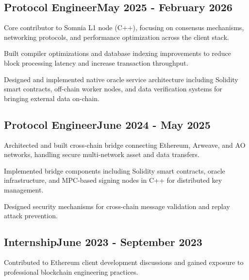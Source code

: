 \documentclass[a4paper,12pt]{article}
\begin{document}
\vspace*{6pt}
\subsection{{Protocol Engineer}\hfill May 2025 - February 2026}
\begin{zitemize}
    \item Core contributor to Somnia L1 node (C++), focusing on consensus mechanisms, networking protocols, and performance optimization across the client stack.
    \item Built compiler optimizations and database indexing improvements to reduce block processing latency and increase transaction throughput.
    \item Designed and implemented native oracle service architecture including Solidity smart contracts, off-chain worker nodes, and data verification systems for bringing external data on-chain.
\end{zitemize}

\vspace*{6pt}
\subsection{{Protocol Engineer}\hfill June 2024 - May 2025}
\begin{zitemize}
    \item Architected and built cross-chain bridge connecting Ethereum, Arweave, and AO networks, handling secure multi-network asset and data transfers.
    \item Implemented bridge components including Solidity smart contracts, oracle infrastructure, and MPC-based signing nodes in C++ for distributed key management.
    \item Designed security mechanisms for cross-chain message validation and replay attack prevention.
\end{zitemize}

\vspace*{3pt}
\subsection{{Internship}\hfill June 2023 - September 2023}
\begin{zitemize}
    \item Contributed to Ethereum client development discussions and gained exposure to professional blockchain engineering practices.
\end{zitemize}
\end{document}
